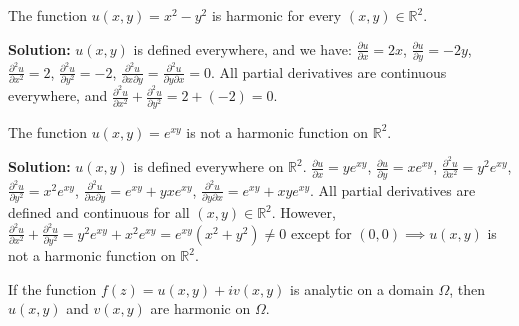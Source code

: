\documentclass[12pt]{article}
\begin{document}
\begin{example}
The function $u(x,y) = x^2 - y^2$ is harmonic for every $(x,y) \in \mathbb{R}^2$.

\textbf{Solution:} $u(x,y)$ is defined everywhere, and we have:
$\frac{\partial u}{\partial x} = 2x$, $\frac{\partial u}{\partial y}
= -2y$, $\frac{\partial^2 u}{\partial x^2} = 2$, $\frac{\partial^2 u}{\partial y^2} = -2$, $\frac{\partial^2 u}{\partial x \partial y} = \frac{\partial^2 u}{\partial y \partial x} = 0$.
All partial derivatives are continuous everywhere, and $\frac{\partial^2 u}{\partial x^2} + \frac{\partial^2 u}{\partial y^2} = 2 + (-2) = 0$.
\end{example}

\begin{example}
The function $u(x,y) = e^{xy}$ is not a harmonic function on $\mathbb{R}^2$.

\textbf{Solution:} $u(x,y)$ is defined everywhere on $\mathbb{R}^2$.
$\frac{\partial u}{\partial x} = ye^{xy}$, $\frac{\partial u}{\partial y} = xe^{xy}$, $\frac{\partial^2 u}{\partial x^2} = y^2e^{xy}$, $\frac{\partial^2 u}{\partial y^2} = x^2e^{xy}$,
$\frac{\partial^2 u}{\partial x \partial y} = e^{xy} + yxe^{xy}$, $\frac{\partial^2 u}{\partial y \partial x} = e^{xy} + xy e^{xy}$.
All partial derivatives are defined and continuous for all $(x,y) \in \mathbb{R}^2$. However,
$\frac{\partial^2 u}{\partial x^2} + \frac{\partial^2 u}{\partial y^2} = y^2e^{xy} + x^2e^{xy} = e^{xy}(x^2 + y^2) \neq 0$ except for $(0,0) \implies u(x,y)$ is not a harmonic function on $\mathbb{R}^2$.
\end{example}

\begin{proposition}
If the function $f(z) = u(x,y) + iv(x,y)$ is analytic on a domain $\Omega$, then $u(x,y)$ and $v(x,y)$ are harmonic on $\Omega$.
\end{proposition}
\end{document}
